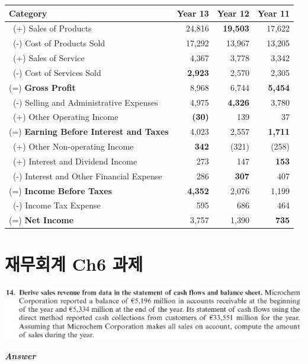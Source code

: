 \documentclass[
  letterpaper,
  DIV=11,
  numbers=noendperiod]{scrreprt}
\begin{document}
\begin{longtable}[]{@{}lrrr@{}}
\toprule\noalign{}
Category & Year 13 & Year 12 & Year 11 \\
\midrule\noalign{}
\endhead
\bottomrule\noalign{}
\endlastfoot
~(+) Sales of Products & 24,816 & \textbf{19,503} & 17,622 \\
~(-) Cost of Products Sold & 17,292 & 13,967 & 13,205 \\
~(+) Sales of Service & 4,367 & 3,778 & 3,342 \\
~(-) Cost of Services Sold & \textbf{2,923} & 2,570 & 2,305 \\
(=) \textbf{Gross Profit} & 8,968 & 6,744 & \textbf{5,454} \\
~(-) Selling and Administrative Expenses & 4,975 & \textbf{4,326} &
3,780 \\
~(+) Other Operating Income & \textbf{(30)} & 139 & 37 \\
(=) \textbf{Earning Before Interest and Taxes} & 4,023 & 2,557 &
\textbf{1,711} \\
~(+) Other Non-operating Income & \textbf{342} & (321) & (258) \\
~(+) Interest and Dividend Income & 273 & 147 & \textbf{153} \\
~(-) Interest and Other Financial Expense & 286 & \textbf{307} & 407 \\
(=) \textbf{Income Before Taxes} & \textbf{4,352} & 2,076 & 1,199 \\
~(-) Income Tax Expense & 595 & 686 & 464 \\
(=) \textbf{Net Income} & 3,757 & 1,390 & \textbf{735} \\
\end{longtable}

\chapter*{재무회계 Ch6
과제}\label{uxc7acuxbb34uxd68cuxacc4-ch6-uxacfcuxc81c}


\includegraphics{images/재무회계_6-14.png}

\textbf{\emph{Answer}}
\end{document}
